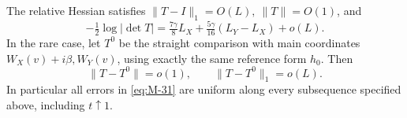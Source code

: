 \begin{lemma}\label{lem:07_magnetic_analysis-determinant}
The relative Hessian satisfies \(\|T-I\|_1=O(L),\ \|T\|=O(1)\), and
\begin{equation}
 -\tfrac12\log|\det T|
 =\tfrac{7\gamma}{8}L_X+\tfrac{5\gamma}{16}(L_Y-L_X)+o(L).
 \label{eq:M-31}
\end{equation}
In the rare case, let \(T^0\) be the straight comparison with
main coordinates \(W_X(v)+i\beta,W_Y(v)\), using exactly the same
reference form \(h_0\). Then
\begin{equation}
 \|T-T^0\|=o(1),\qquad \|T-T^0\|_1=o(L).
 \label{eq:M-32}
\end{equation}
In particular all errors in \eqref{eq:M-31} are uniform along every subsequence
specified above, including \(t\uparrow1\).
\end{lemma}
